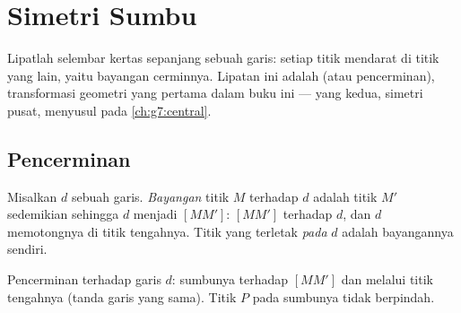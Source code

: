 \chapter{Simetri Sumbu}\label{ch:g6:symmetry}

Lipatlah selembar kertas sepanjang sebuah garis: setiap titik mendarat
di titik yang lain, yaitu bayangan cerminnya. Lipatan ini adalah
\emph{} (atau pencerminan), transformasi geometri yang
pertama dalam buku ini --- yang kedua, simetri pusat, menyusul pada
\cref{ch:g7:central}.

\section{Pencerminan}

\begin{definition}\label{def:g6:symmetry:def}
Misalkan $d$ sebuah garis. \emph{Bayangan} titik
$M$ terhadap $d$ adalah titik $M'$ sedemikian sehingga $d$ menjadi
 $[MM']$:  $[MM']$  terhadap $d$, dan
$d$ memotongnya di titik tengahnya. Titik yang terletak \emph{pada}
$d$ adalah bayangannya sendiri.
\end{definition}

\begin{omfigure}

{\small Pencerminan terhadap garis $d$: sumbunya  terhadap
$[MM']$ dan melalui titik tengahnya (tanda garis yang sama). Titik $P$
pada sumbunya tidak berpindah.}
\end{omfigure}

